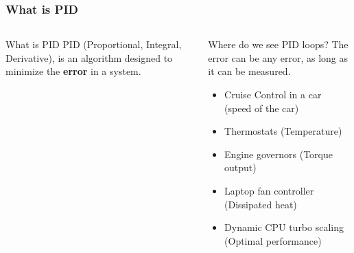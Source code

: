 \documentclass[aspectratio=169]{beamer}
\begin{document}
\begin{frame}
    \frametitle{What is PID}

    \begin{columns}
        \begin{column}{0.48\textwidth}
            \begin{block}{What is PID}
                PID (Proportional, Integral, Derivative),
                is an algorithm designed to minimize the
                \textbf{error} in a system.
            \end{block}
        \end{column}

        \begin{column}{0.48\textwidth}
            \begin{block}{Where do we see PID loops?}
                The error can be any error, as long as it can be measured.
                \begin{itemize}
                 \item Cruise Control in a car (speed of the car)
                 \item Thermostats (Temperature)
                 \item Engine governors (Torque output)
                 \item Laptop fan controller (Dissipated heat)
                 \item Dynamic CPU turbo scaling (Optimal performance)
                \end{itemize}
            \end{block}
        \end{column}
    \end{columns}

\end{frame}
\end{document}
